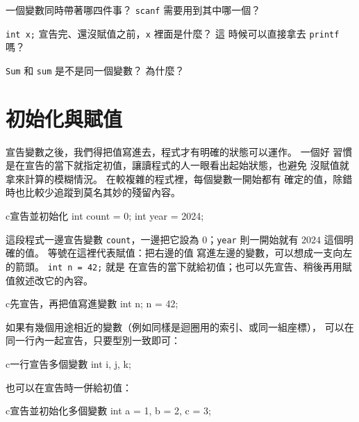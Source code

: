 

\begin{drills}[label=drills:basic-int-vars]
\item 一個變數同時帶著哪四件事？ \texttt{scanf} 需要用到其中哪一個？
\item \texttt{int x;} 宣告完、還沒賦值之前，\texttt{x} 裡面是什麼？ 這
時候可以直接拿去 \texttt{printf} 嗎？
\item \texttt{Sum} 和 \texttt{sum} 是不是同一個變數？ 為什麼？
\end{drills}

\section{初始化與賦值}
\label{sec:basic-init-assign}

宣告變數之後，我們得把值寫進去，程式才有明確的狀態可以運作。 一個好
習慣是在宣告的當下就指定初值，讓讀程式的人一眼看出起始狀態，也避免
沒賦值就拿來計算的模糊情況。 在較複雜的程式裡，每個變數一開始都有
確定的值，除錯時也比較少追蹤到莫名其妙的殘留內容。

\begin{code}{c}{宣告並初始化}
int count = 0;
int year = 2024;
\end{code}

這段程式一邊宣告變數 \texttt{count}，一邊把它設為 $0$；\texttt{year}
則一開始就有 $2024$ 這個明確的值。 等號在這裡代表賦值：把右邊的值
寫進左邊的變數，可以想成一支向左的箭頭。 \texttt{int n = 42;} 就是
在宣告的當下就給初值；也可以先宣告、稍後再用賦值敘述改它的內容。

\begin{code}{c}{先宣告，再把值寫進變數}
int n;
n = 42;
\end{code}

如果有幾個用途相近的變數（例如同樣是迴圈用的索引、或同一組座標），
可以在同一行內一起宣告，只要型別一致即可：

\begin{code}{c}{一行宣告多個變數}
int i, j, k;
\end{code}

也可以在宣告時一併給初值：

\begin{code}{c}{宣告並初始化多個變數}
int a = 1, b = 2, c = 3;
\end{code}

